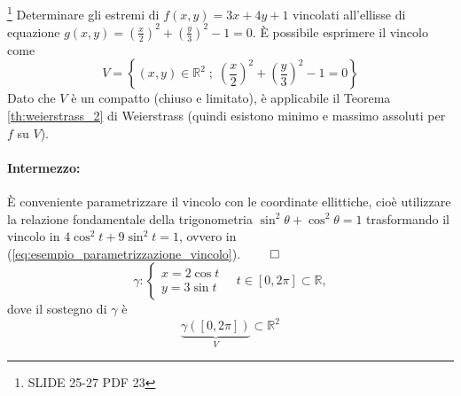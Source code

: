 \begin{example}
	\footnote{SLIDE 25-27 PDF 23}
	Determinare gli estremi di $f(x,y)=3x+4y+1$ vincolati all'ellisse di equazione $g(x,y)=\left(\frac{x}{2}\right)^2 + \left(\frac{y}{3}\right)^2 -1 = 0$.
	È possibile esprimere il vincolo come
	\begin{equation*}
		V=\left\{(x,y)\in\mathbb{R}^2\;;\; \left(\frac{x}{2}\right)^2 + \left(\frac{y}{3}\right)^2 -1 = 0\right\}
	\end{equation*}
	Dato che $V$ è un compatto (chiuso e limitato), è applicabile il Teorema \ref{th:weierstrass_2} di Weierstrass (quindi esistono minimo e massimo assoluti per $f$ su $V$).
	\paragraph{Intermezzo:} È conveniente parametrizzare il vincolo con le coordinate ellittiche, cioè utilizzare la relazione fondamentale della trigonometria $\sin^2\theta + \cos^2\theta = 1$ trasformando il vincolo in $4\cos^2 t + 9\sin^2 t = 1$, ovvero in (\ref{eq:esempio_parametrizzazione_vincolo}). $\qed$
	\begin{equation}\label{eq:esempio_parametrizzazione_vincolo}
		\gamma:\begin{cases}
			x = 2\cos t\\
			y = 3\sin t
		\end{cases}\quad t\in[0,2\pi]\subset\mathbb{R},
	\end{equation}
	dove il sostegno di $\gamma$ è
	\begin{equation}\label{eq:esempio_sostegno_vincolo}
		\underbrace{\gamma([0,2\pi])}_{V}\subset\mathbb{R}^2
	\end{equation}

\end{example}
